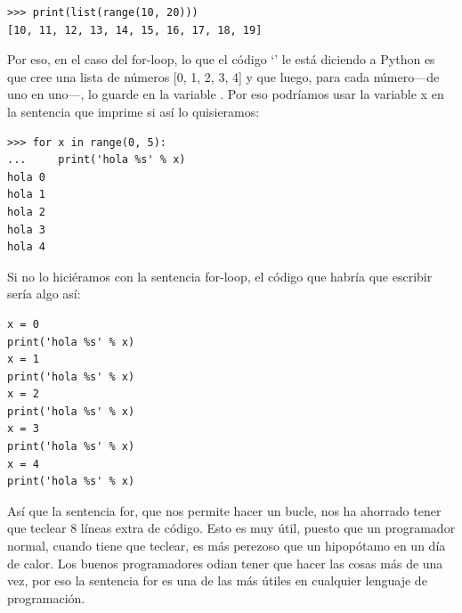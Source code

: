 \begin{listing}
\begin{verbatim}
>>> print(list(range(10, 20)))
[10, 11, 12, 13, 14, 15, 16, 17, 18, 19]
\end{verbatim}
\end{listing}

Por eso, en el caso del for-loop, lo que el código `' le está diciendo a Python es que cree una lista de números [0, 1, 2, 3, 4] y que luego, para cada número---de uno en uno---, lo guarde en la variable . Por eso podríamos usar la variable x en la sentencia que imprime si así lo quisieramos:

\begin{listing}
\begin{verbatim}
>>> for x in range(0, 5):
...     print('hola %s' % x)
hola 0
hola 1
hola 2
hola 3
hola 4
\end{verbatim}
\end{listing}

Si no lo hiciéramos con la sentencia for-loop, el código que habría que escribir sería algo así:

\begin{listing}
\begin{verbatim}
x = 0
print('hola %s' % x)
x = 1
print('hola %s' % x)
x = 2
print('hola %s' % x)
x = 3
print('hola %s' % x)
x = 4
print('hola %s' % x)
\end{verbatim}
\end{listing}

Así que la sentencia for, que nos permite hacer un bucle, nos ha ahorrado tener que teclear 8 líneas extra de código.  Esto es muy útil, puesto que un programador normal, cuando tiene que teclear, es más perezoso que un hipopótamo en un día de calor. Los buenos programadores odian tener que hacer las cosas más de una vez, por eso la sentencia for es una de las más útiles en cualquier lenguaje de programación.

